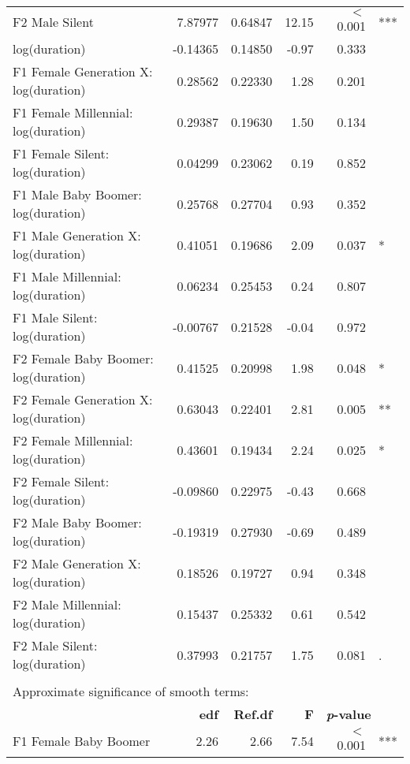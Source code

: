 \begin{table}[ht]
{{\begin{tabular}{l r r r r@{\hskip1pt} @{\hskip0pt}l}
{}F2 Male Silent               &  7.87977  &  0.64847 &  12.15 &  $<$ 0.001 & *** \\
log(duration)                                        & -0.14365  &  0.14850 &  -0.97 &      0.333 &     \\
{}F1 Female Generation X: log(duration)        &  0.28562  &  0.22330 &   1.28 &      0.201 &     \\
{}F1 Female Millennial: log(duration)  &  0.29387  &  0.19630 &   1.50 &      0.134 &     \\
{}F1 Female Silent: log(duration)      &  0.04299  &  0.23062 &   0.19 &      0.852 &     \\
{}F1 Male Baby Boomer: log(duration)      &  0.25768  &  0.27704 &   0.93 &      0.352 &     \\
{}F1 Male Generation X: log(duration)        &  0.41051  &  0.19686 &   2.09 &      0.037 & *   \\
{}F1 Male Millennial: log(duration)  &  0.06234  &  0.25453 &   0.24 &      0.807 &     \\
{}F1 Male Silent: log(duration)      & -0.00767  &  0.21528 &  -0.04 &      0.972 &     \\
{}F2 Female Baby Boomer: log(duration)      &  0.41525  &  0.20998 &   1.98 &      0.048 & *   \\
{}F2 Female Generation X: log(duration)        &  0.63043  &  0.22401 &   2.81 &      0.005 & **  \\
{}F2 Female Millennial: log(duration)  &  0.43601  &  0.19434 &   2.24 &      0.025 & *   \\
{}F2 Female Silent: log(duration)      & -0.09860  &  0.22975 &  -0.43 &      0.668 &     \\
{}F2 Male Baby Boomer: log(duration)      & -0.19319  &  0.27930 &  -0.69 &      0.489 &     \\
{}F2 Male Generation X: log(duration)        &  0.18526  &  0.19727 &   0.94 &      0.348 &     \\
{}F2 Male Millennial: log(duration)  &  0.15437  &  0.25332 &   0.61 &      0.542 &     \\
{}F2 Male Silent: log(duration)      &  0.37993  &  0.21757 &   1.75 &      0.081 & .   \\
\\
\multicolumn{6}{l}{Approximate significance of smooth terms:}\\
 & \textbf{edf} & \textbf{Ref.df} & \textbf{F} & \multicolumn{2}{l}{\textbf{\textit{p}-value}}\\
{}{}F1 Female Baby Boomer      &  2.26 &   2.66 &   7.54 &        $<$ 0.001 & *** \\

\end{tabular}}}
\end{table}
